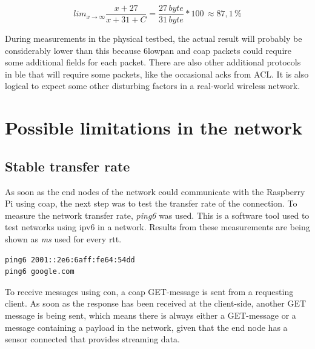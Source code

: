 \begin{equation} \label{percentageHeader}
    lim_{x\to\infty} \frac{x + 27}{x + 31 + C} = \frac{27 \, byte}{31 \, byte}*100 \, \approx 87,1 \,\%
\end{equation} 



\noindent During measurements in the physical testbed, the actual result will probably be considerably lower than this because \gls{6lowpan} and \gls{coap} packets could require some additional fields for each packet. There are also other additional protocols in \gls{ble} that will require some packets, like the occasional \glspl{ack} from ACL. It is also logical to expect some other disturbing factors in a real-world wireless network. 

\section{Possible limitations in the network}

\subsection{Stable transfer rate}

\noindent As soon as the end nodes of the network could communicate with the Raspberry Pi using \gls{coap}, the next step was to test the transfer rate of the connection. To measure the network transfer rate, \textit{ping6} was used. This is a software tool used to test networks using \gls{ipv6} in a network. Results from these measurements are being shown as \textit{ms} used for every \acrlong{rtt}. 

\begin{verbatim}
ping6 2001::2e6:6aff:fe64:54dd
ping6 google.com
\end{verbatim}



\noindent To receive messages using \gls{con}, a \gls{coap} GET-message is sent from a requesting client. As soon as the response has been received at the client-side, another GET message is being sent, which means there is always either a GET-message or a message containing a \gls{payload} in the network, given that the end node has a sensor connected that provides streaming data. 

